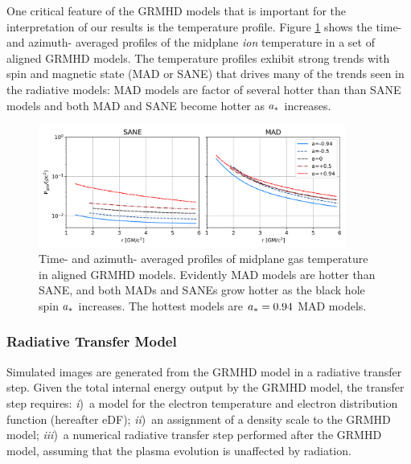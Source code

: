 One critical feature of the GRMHD models that is important for the interpretation of our results is the temperature profile.  Figure \ref{fig:grmhd_temp} shows the time- and azimuth- averaged profiles of the midplane {\em ion} temperature in a set of aligned GRMHD models.  The temperature profiles exhibit strong trends with spin and magnetic state (MAD or SANE) that drives many of the trends seen in the radiative models: MAD models are factor of several hotter than than SANE models and both MAD and SANE become hotter as $a_*$ increases.

\begin{figure}
  \centering
  \includegraphics[width=0.9\textwidth]{figures/grmhd_temp.png}
  \caption{Time- and azimuth- averaged profiles of midplane gas temperature in aligned GRMHD models.  Evidently MAD models are hotter than SANE, and both MADs and SANEs grow hotter as the black hole spin $a_*$ increases.  The hottest models are $a_* = 0.94$ MAD models.}
  \label{fig:grmhd_temp}
\end{figure}

\subsubsection{Radiative Transfer Model}

Simulated images are generated from the GRMHD model in a radiative transfer step.
Given the total internal energy output by the GRMHD model, the transfer step requires: %
\emph{i})~a model for the electron temperature and electron distribution function (hereafter eDF);
\emph{ii})~an assignment of a density scale to the GRMHD model;
\emph{iii})~a numerical radiative transfer step performed after the GRMHD model, assuming that the plasma evolution is unaffected by radiation.

\label{sec:eDF}

